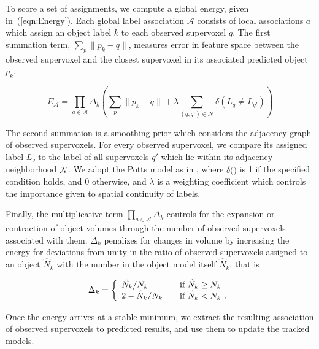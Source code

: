 To score a set of assignments, we compute a global energy, given in~(\ref{eqn:Energy}). Each global label association $\mathcal{A}$ consists of local associations $a$ which assign an object label $k$ to each observed supervoxel $q$. The first summation term, $ \sum_{p}{\|p_k - q\|} $, measures error in feature space between the observed supervoxel and the closest supervoxel in its associated predicted object $p_k$. 

\begin{equation}
\label{eqn:Energy}
{E}_\mathcal{A} =\prod_{a\in\mathcal{A}}{\Delta_k} \left( \sum_{p}{\|p_k - q\|} + \lambda \sum_{(q,q')\in \mathcal{N} }\delta(L_q \not= L_{q'}) \right) 
\end{equation}

The second summation is a smoothing prior which considers the adjacency graph of observed supervoxels. For every observed supervoxel, we compare its assigned label $L_q$ to the label of all supervoxels $q'$ which lie within its adjacency neighborhood $\mathcal{N}$. We adopt the Potts model as in \cite{Boykov2001}, where $\delta(\dot)$ is 1 if the specified condition holds, and 0 otherwise, and $\lambda$ is a weighting coefficient which controls the importance given to spatial continuity of labels.

Finally, the multiplicative term $\prod_{a\in\mathcal{A}}{\Delta_k}$ controls for the expansion or contraction of object volumes through the number of observed supervoxels associated with them. $\Delta_k$ penalizes for changes in volume by increasing the energy for deviations from unity in the ratio of observed supervoxels assigned to an object $\hat{N}_k$ with the number in the object model itself $\hat{N}_k$, that is

\begin{equation}
\label{eqn:DeltaSVs}
\Delta_k = \left\{ 
  \begin{array}{l l}
    {\hat{N}_k}/{N_k} & \quad \text{if ${\hat{N}_k} \geq {{N}_k}$ }\\
    2 - {\hat{N}_k}/{N_k} & \quad \text{if $\hat{N}_k < {N}_k$}~. 
  \end{array} \right.  
\end{equation}

Once the energy arrives at a stable minimum, we extract the resulting association of observed supervoxels to predicted results, and use them to update the tracked models.

